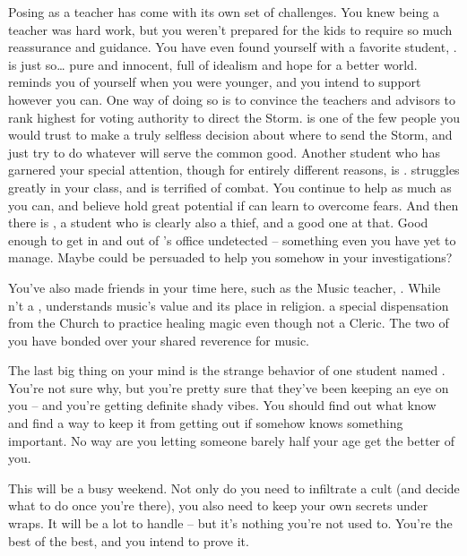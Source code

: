 \documentclass[char]{GL2020}
\begin{document}
Posing as a teacher has come with its own set of challenges. You knew being a teacher was hard work, but you weren't prepared for the kids to require so much reassurance and guidance. You have even found yourself with a favorite student, \cDisney{\full}. \cDisney{} is just so\ldots{} pure and innocent, full of idealism and hope for a better world. \cDisney{\They} reminds you of yourself when you were younger, and you intend to support \cDisney{\them} however you can. One way of doing so is to convince the \pTech{} teachers and \pFarm{} advisors to rank \cDisney{} highest for voting authority to direct the Storm. \cDisney{} is one of the few people you would trust to make a truly selfless decision about where to send the Storm, and just try to do whatever will serve the common good. Another student who has garnered your special attention, though for entirely different reasons, is \cAdopted{\full}. \cAdopted{} struggles greatly in your class, and is terrified of combat. You continue to help \cAdopted{\them} as much as you can, and believe \cAdopted{\they} hold great potential if \cAdopted{\they} can learn to overcome \cAdopted{\their} fears. And then there is \cPirateChild{\full}, a student who is clearly also a thief, and a good one at that. Good enough to get in and out of \cChupInventor{}'s office undetected -- something even you have yet to manage. Maybe \cPirateChild{} could be persuaded to help you somehow in your investigations?

You've also made friends in your time here, such as the Music teacher, \cMusic{\full}. While \cMusic{\theyare}n't a \cMusic{\cleric} \cMusic{\themself}, \cMusic{\they} understands \cMusic{\plural} music's value and its place in religion. \cMusic{\They} \cMusic{\have} a special dispensation from the Church to practice healing magic even though \cMusic{\theyare} not a Cleric. The two of you have bonded over your shared reverence for music. 

The last big thing on your mind is the strange behavior of one \pFarm{} student named \cLibAssist{\full}. You're not sure why, but you're pretty sure that they've been keeping an eye on you -- and you're getting definite shady vibes. You should find out what \cLibAssist{\they} know\cLibAssist{\plural} and find a way to keep it from getting out if \cLibAssist{} somehow knows something important. No way are you letting someone barely half your age get the better of you.

This will be a busy weekend. Not only do you need to infiltrate a cult (and decide what to do once you're there), you also need to keep your own secrets under wraps. It will be a lot to handle -- but it's nothing you're not used to. You're the best of the best, and you intend to prove it.
\end{document}
